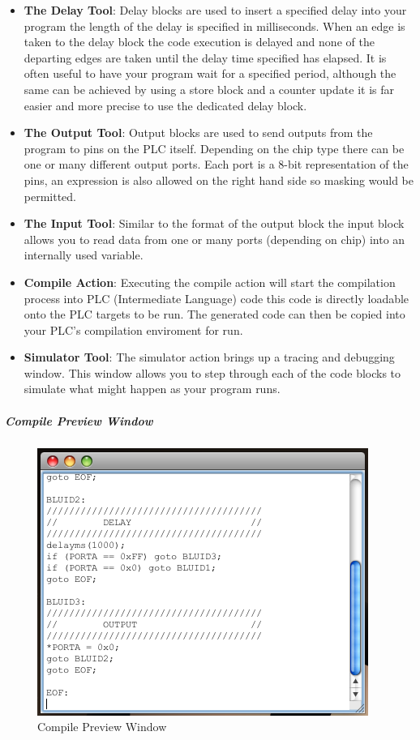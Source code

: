 \begin{itemize}
\item \textbf{The Delay Tool}: Delay blocks are used to insert a specified delay into your program the length of the delay is specified in milliseconds. When an edge is taken to the delay block the code execution is delayed and none of the departing edges are taken until the delay time specified has elapsed. It is often useful to have your program wait for a specified period, although the same can be achieved by using a store block and a counter update it is far easier and more precise to use the dedicated delay block.
\item \textbf{The Output Tool}: Output blocks are used to send outputs from the program to pins on the PLC itself. Depending on the chip type there can be one or many different output ports. Each port is a 8-bit representation of the pins, an expression is also allowed on the right hand side so masking would be permitted.
\item \textbf{The Input Tool}: Similar to the format of the output block the input block allows you to read data from one or many ports (depending on chip) into an internally used variable.

\item \textbf{Compile Action}: Executing the compile action will start the compilation process into PLC  (Intermediate Language) code this code is directly loadable onto the PLC targets to be run. The generated code can then be copied into your PLC's compilation enviroment for run.

\item \textbf{Simulator Tool}: The simulator action brings up a tracing and debugging window. This window allows you to step through each of the code blocks to simulate what might happen as your program runs.
\end{itemize}

\subparagraph{Compile Preview Window}
\begin{figure}[htp]
    \centering
    \includegraphics[width=\imgmedium]{./images/plcedit_compile.png}
    \caption{Compile Preview Window}
    \label{fig:plcedit_compile}
\end{figure}


